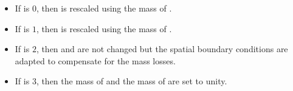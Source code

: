         \begin{itemize}
            \item If  is $0$, then \fII{} is rescaled using the mass of \fI{}. 
            \item If  is $1$, then \fI{} is rescaled using the mass of \fII{}.
            \item If  is $2$, then \fI{} and \fII{} are not changed but the
                spatial boundary conditions are adapted to compensate for the mass losses. 
            \item If  is $3$, then the mass of \fI{} and
                the mass of \fII{} are set to unity.
        \end{itemize}

